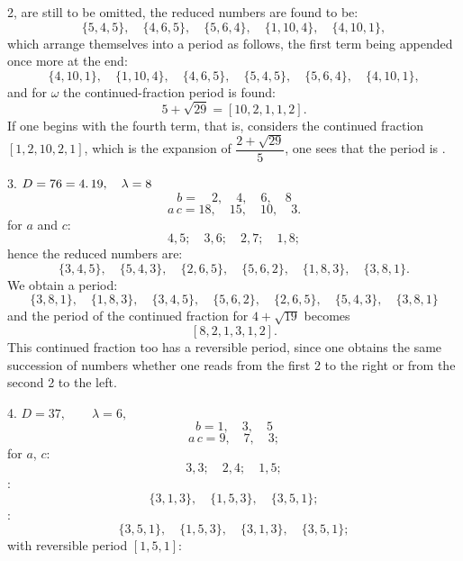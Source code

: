 2, are still to be omitted, the reduced numbers are found
to be:
\[
\{5, 4, 5\}, \quad \{4, 6, 5\}, \quad \{5, 6, 4\}, \quad \{1, 10, 4\}, \quad \{4, 10, 1\},
\]
which arrange themselves into a period as follows, the first term
being appended once more at the end:
\[
\{4, 10, 1\}, \quad \{1, 10, 4\}, \quad \{4, 6, 5\}, \quad \{5, 4, 5\}, \quad \{5, 6, 4\}, \quad \{4, 10, 1\},
\]
and for $\omega$ the continued-fraction period is found:
\[
5 + \sqrt{29} = [10, 2, 1, 1, 2].
\]
If one begins with the fourth term, that is, considers the continued
fraction $[1, 2, 10, 2, 1]$, which is the expansion of $\dfrac{2 + \sqrt{29}}{5}$,
one sees that the period is .

3. $D = 76 = 4 \ldotp 19, \quad \lambda = 8$
\[
b = \quad 2, \quad 4, \quad 6, \quad 8
\]
\[
a\,c = 18, \quad 15, \quad 10, \quad 3.
\]
 for $a$ and $c$:
\[
4, 5; \quad 3, 6; \quad 2, 7; \quad 1, 8;
\]
hence the reduced numbers are:
\[
\{3, 4, 5\}, \quad \{5, 4, 3\}, \quad \{2, 6, 5\}, \quad \{5, 6, 2\}, \quad \{1, 8, 3\}, \quad \{3, 8, 1\}.
\]
We obtain a period:
\[
\{3, 8, 1\}, \quad \{1, 8, 3\}, \quad \{3, 4, 5\}, \quad \{5, 6, 2\}, \quad \{2, 6, 5\}, \quad \{5, 4, 3\}, \quad \{3, 8, 1\}
\]
and the period of the continued fraction for $4 + \sqrt{19}$ becomes
\[
[8, 2, 1, 3, 1, 2].
\]
This continued fraction too has a reversible period, since
one obtains the same succession of numbers whether one reads
from the first 2 to the right or from the second 2 to the left.

4. $D = 37, \qquad \lambda = 6,$
\[
b = 1, \quad 3, \quad 5
\]
\[
a\,c = 9, \quad 7, \quad 3;
\]
 for $a$, $c$:
\[
3, 3; \quad 2, 4; \quad 1, 5;
\]
:
\[
\{3, 1, 3\}, \quad \{1, 5, 3\}, \quad \{3, 5, 1\};
\]
:
\[
\{3, 5, 1\}, \quad \{1, 5, 3\}, \quad \{3, 1, 3\}, \quad \{3, 5, 1\};
\]
 with reversible period $[1, 5, 1]$:
